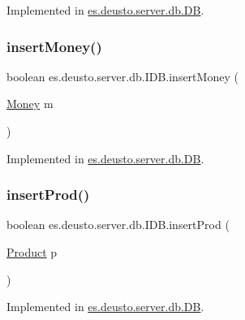 Implemented in \hyperlink{classes_1_1deusto_1_1server_1_1db_1_1_d_b_aa193a59efe6c2458d89fd751da935a3a}{es.\+deusto.\+server.\+db.\+DB}.

\mbox{\label{interfacees_1_1deusto_1_1server_1_1db_1_1_i_d_b_afcce296d82fa0a6fb8083215b3647663}} 
\subsubsection{\texorpdfstring{insert\+Money()}{insertMoney()}}
{\footnotesize\ttfamily boolean es.\+deusto.\+server.\+db.\+I\+D\+B.\+insert\+Money (\begin{DoxyParamCaption}\item[{\hyperlink{classes_1_1deusto_1_1server_1_1db_1_1data_1_1_money}{Money}}]{m }\end{DoxyParamCaption})}



Implemented in \hyperlink{classes_1_1deusto_1_1server_1_1db_1_1_d_b_ab9a9acacfc8dadaeec7159c0886dfec2}{es.\+deusto.\+server.\+db.\+DB}.

\mbox{\label{interfacees_1_1deusto_1_1server_1_1db_1_1_i_d_b_a4c9c0a9511fde5b541a49de8f8399d28}} 
\subsubsection{\texorpdfstring{insert\+Prod()}{insertProd()}}
{\footnotesize\ttfamily boolean es.\+deusto.\+server.\+db.\+I\+D\+B.\+insert\+Prod (\begin{DoxyParamCaption}\item[{\hyperlink{classes_1_1deusto_1_1server_1_1db_1_1data_1_1_product}{Product}}]{p }\end{DoxyParamCaption})}



Implemented in \hyperlink{classes_1_1deusto_1_1server_1_1db_1_1_d_b_a2f5a50ff22834658b641ebf6bb7afbe6}{es.\+deusto.\+server.\+db.\+DB}.


